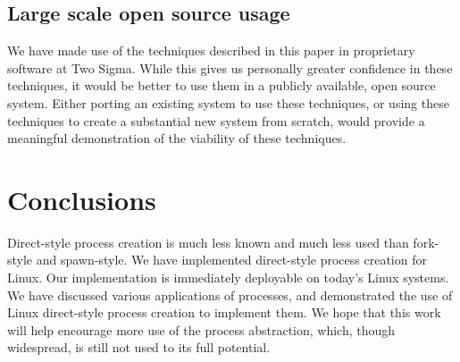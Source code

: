 \documentclass{acmart}
\begin{document}
\subsection{Large scale open source usage}
We have made use of the techniques described in this paper
in proprietary software at Two Sigma.
While this gives us personally greater confidence in these techniques,
it would be better to use them in a publicly available, open source system.
Either porting an existing system to use these techniques,
or using these techniques to create a substantial new system from scratch,
would provide a meaningful demonstration of the viability of these techniques.
\section{Conclusions}\label{conclusions}
Direct-style process creation is much less known and much less used than fork-style and spawn-style.
We have implemented direct-style process creation for Linux.
Our implementation is immediately deployable on today's Linux systems.
We have discussed various applications of processes,
and demonstrated the use of Linux direct-style process creation
to implement them.
We hope that this work will help encourage more use of the process abstraction,
which, though widespread,
is still not used to its full potential.



\end{document}

